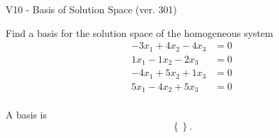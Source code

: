 \begin{exercise}
  \begin{exerciseTitle}V10 - Basis of Solution Space (ver. 301)\end{exerciseTitle}
  \begin{exerciseStatement}
    Find a basis for the solution space of the homogeneous system 
\begin{align*}
 -3 x_ 1 + 4 x_ 2 -4 x_ 3 &= 0  \\ 
  1 x_ 1 -1 x_ 2 -2 x_ 3 &= 0  \\ 
  -4 x_ 1 + 5 x_ 2 + 1 x_ 3 &= 0  \\ 
  5 x_ 1 -4 x_ 2 + 5 x_ 3 &= 0  \\ 
 \end{align*}


 
  \end{exerciseStatement}

  \begin{exerciseAnswer}
   A basis is   
\[\left\{\right\}.\]

  


  \end{exerciseAnswer}
\end{exercise}